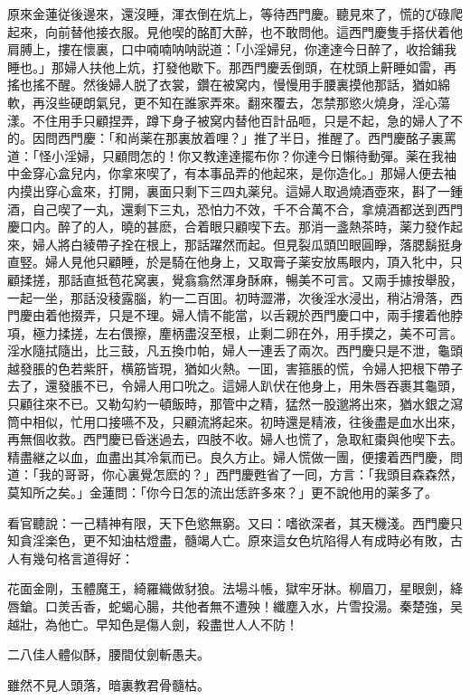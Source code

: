 原來金蓮従後邊來，還沒睡，渾衣倒在炕上，等待西門慶。聽見來了，慌的ぴ碌爬起來，向前替他接衣服。見他喫的酩酊大醉，也不敢問他。這西門慶隻手搭伏着他肩膊上，摟在懷裏，口中喃喃呐呐説道：「小淫婦兒，你達達今日醉了，收拾鋪我睡也。」那婦人扶他上炕，打發他歇下。那西門慶丢倒頭，在枕頭上鼾睡如雷，再搖也搖不醒。然後婦人脱了衣裳，鑽在被窝内，慢慢用手腰裏摸他那話，猶如綿軟，再沒些硬朗氣兒，更不知在誰家弄來。翻來覆去，怎禁那慾火燒身，淫心蕩漾。不住用手只顧捏弄，蹲下身子被窝内替他百計品咂，只是不起，急的婦人了不的。因問西門慶：「和尚薬在那裏放着哩？」推了半日，推醒了。西門慶酩子裏罵道：「怪小淫婦，只顧問怎的！你又教達達擺布你？你達今日懶待動彈。薬在我袖中金穿心盒兒内，你拿來喫了，有本事品弄的他起來，是你造化。」那婦人便去袖内摸出穿心盒來，打開，裏面只剩下三四丸薬兒。這婦人取過燒酒壺來，斟了一鍾酒，自己喫了一丸，還剩下三丸，恐怕力不效，千不合萬不合，拿燒酒都送到西門慶口内。醉了的人，曉的甚麽，合着眼只顧喫下去。那消一盞熱茶時，薬力發作起來，婦人將白綾帶子拴在根上，那話躍然而起。但見裂瓜頭凹眼圓睜，落腮鬍挺身直竪。婦人見他只顧睡，於是騎在他身上，又取膏子薬安放馬眼内，頂入牝中，只顧揉搓，那話直抵苞花窝裏，覺翕翕然渾身酥麻，暢美不可言。又兩手據按舉股，一起一坐，那話没稜露腦，約一二百囬。初時澀滞，次後淫水浸出，稍沾滑落，西門慶由着他掇弄，只是不理。婦人情不能當，以舌親於西門慶口中，兩手摟着他脖項，極力揉搓，左右偎擦，麈柄盡沒至根，止剩二卵在外，用手摸之，美不可言。淫水隨拭隨出，比三鼓，凡五換巾帕，婦人一連丢了兩次。西門慶只是不泄，龜頭越發脹的色若紫肝，横筋皆現，猶如火熱。一囬，害箍脹的慌，令婦人把根下帶子去了，還發脹不已，令婦人用口吮之。這婦人趴伏在他身上，用朱唇吞裹其龜頭，只顧往來不已。又勒勾約一頓飯時，那管中之精，猛然一股邈將出來，猶水銀之瀉筒中相似，忙用口接嚥不及，只顧流將起來。初時還是精液，往後盡是血水出來，再無個收救。西門慶已昏迷過去，四肢不收。婦人也慌了，急取紅棗與他喫下去。精盡継之以血，血盡出其冷氣而已。良久方止。婦人慌做一團，便摟着西門慶，問道：「我的哥哥，你心裏覺怎麽的？」西門慶甦省了一囘，方言：「我頭目森森然，莫知所之矣。」金蓮問：「你今日怎的流出恁許多來？」更不說他用的薬多了。

看官聽說：一己精神有限，天下色慾無窮。又曰：嗜欲深者，其天機淺。西門慶只知貪淫楽色，更不知油枯燈盡，髓竭人亡。原來這女色坑陷得人有成時必有敗，古人有幾句格言道得好：

\begin{myquote}
花面金剛，玉體魔王，綺羅織做豺狼。法場斗帳，獄牢牙牀。柳眉刀，星眼劍，絳唇鎗。口羙舌香，蛇蝎心腸，共他者無不遭殃！纖塵入水，片雪投湯。秦楚強，吴越壯，為他亡。早知色是傷人劍，殺盡世人人不防！

二八佳人體似酥，腰間仗劍斬愚夫。

雖然不見人頭落，暗裏教君骨髓枯。
\end{myquote}

